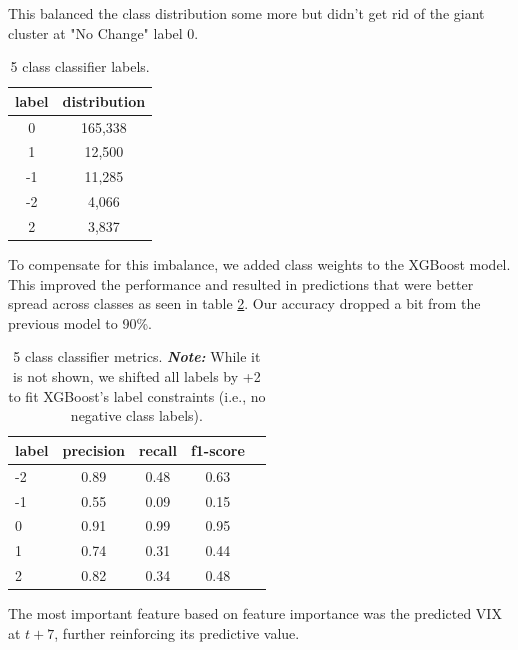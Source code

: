 \documentclass[twocolumn]{article}
\begin{document}
This balanced the class distribution some more but didn't get rid of the giant cluster at "No Change" label 0.

\begin{table}[h!]
\centering
\small
\begin{tabular}{|c|c|}
\hline
\textbf{label} & \textbf{distribution} \\
\hline
  0  &   165,338 \\
  1  &    12,500 \\
 -1  &    11,285 \\
 -2  &     4,066 \\
  2  &     3,837 \\
\hline
\end{tabular}
\caption{5 class classifier labels.}
\label{tab:5-class-distribution}
\end{table}

To compensate for this imbalance, we added class weights to the XGBoost model. This improved the performance and resulted in predictions that were better spread across classes as seen in table \ref{tab:5-class-metrics}. Our accuracy dropped a bit from the previous model to 90\%.

\begin{table}[h!]
\centering
\small
\begin{tabular}{|l|c|c|c|c|}
\hline
\textbf{label} & \textbf{precision} & \textbf{recall} & \textbf{f1-score} \\
\hline
             -2    &   0.89  &    0.48  &    0.63  \\
             -1    &   0.55  &    0.09  &    0.15  \\
              0    &   0.91  &    0.99  &    0.95  \\
              1    &   0.74  &    0.31  &    0.44  \\
              2    &   0.82  &    0.34  &    0.48  \\
\hline
\end{tabular}
\caption{5 class classifier metrics. \textbf{\textit{Note:}} While it is not shown, we shifted all labels by +2 to fit XGBoost’s label constraints (i.e., no negative class labels).}
\label{tab:5-class-metrics}
\end{table}


The most important feature based on feature importance was the predicted VIX at $t+7$, further reinforcing its predictive value.
\end{document}
